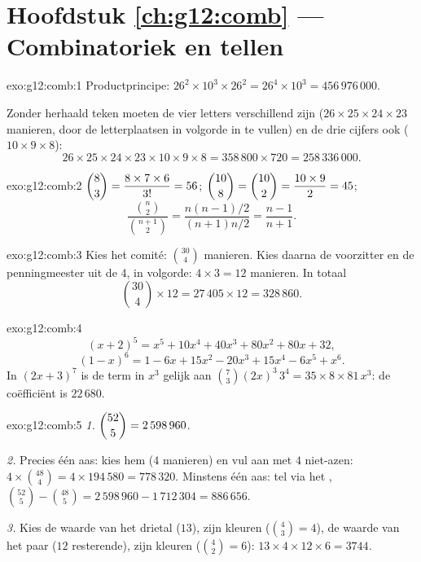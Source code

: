 \section*{Hoofdstuk \ref{ch:g12:comb} --- Combinatoriek en tellen}

\begin{solution}{exo:g12:comb:1}
Productprincipe:
$26^2 \times 10^3 \times 26^2 = 26^4 \times 10^3 = 456\,976\,000$.

Zonder herhaald teken moeten de vier letters verschillend zijn
($26 \times 25 \times 24 \times 23$ manieren, door de letterplaatsen in
volgorde in te vullen) en de drie cijfers ook ($10 \times 9 \times 8$):
\[
26 \times 25 \times 24 \times 23 \times 10 \times 9 \times 8
= 358\,800 \times 720 = 258\,336\,000 .
\]
\end{solution}

\begin{solution}{exo:g12:comb:2}
$\dbinom83 = \dfrac{8 \times 7 \times 6}{3!} = 56$;
$\dbinom{10}{8} = \dbinom{10}{2} = \dfrac{10 \times 9}{2} = 45$;
\[
\frac{\binom n2}{\binom{n+1}2}
= \frac{n(n-1)/2}{(n+1)n/2} = \frac{n-1}{n+1}.
\]
\end{solution}

\begin{solution}{exo:g12:comb:3}
Kies het comité: $\binom{30}{4}$ manieren. Kies daarna de voorzitter en de
penningmeester uit de 4, in volgorde: $4 \times 3 = 12$ manieren. In totaal
\[
\binom{30}{4} \times 12 = 27\,405 \times 12 = 328\,860 .
\]
\end{solution}

\begin{solution}{exo:g12:comb:4}
\[
(x+2)^5 = x^5 + 10x^4 + 40x^3 + 80x^2 + 80x + 32 ,
\]
\[
(1-x)^6 = 1 - 6x + 15x^2 - 20x^3 + 15x^4 - 6x^5 + x^6 .
\]
In $(2x+3)^7$ is de term in $x^3$ gelijk aan
$\binom{7}{3}(2x)^3\,3^4 = 35 \times 8 \times 81\, x^3$: de coëfficiënt is
$22\,680$.
\end{solution}

\begin{solution}{exo:g12:comb:5}
\emph{1.} $\dbinom{52}{5} = 2\,598\,960$.

\emph{2.} Precies één aas: kies hem ($4$ manieren) en vul aan met $4$
niet-azen: $4 \times \binom{48}{4} = 4 \times 194\,580 = 778\,320$.
Minstens één aas: tel via het ,
$\binom{52}{5} - \binom{48}{5} = 2\,598\,960 - 1\,712\,304 = 886\,656$.

\emph{3.} Kies de waarde van het drietal ($13$), zijn kleuren
($\binom43 = 4$), de waarde van het paar ($12$ resterende), zijn kleuren
($\binom42 = 6$):
$13 \times 4 \times 12 \times 6 = 3744$.
\end{solution}


